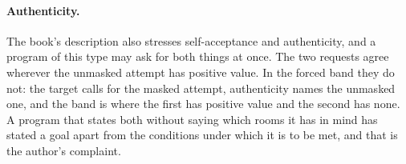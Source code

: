 
\paragraph{Authenticity.} The book's description also stresses self-acceptance and authenticity, and a program of this type may ask for both things at once. The two requests agree wherever the unmasked attempt has positive value. In the forced band they do not: the target calls for the masked attempt, authenticity names the unmasked one, and the band is where the first has positive value and the second has none. A program that states both without saying which rooms it has in mind has stated a goal apart from the conditions under which it is to be met, and that is the author's complaint.

